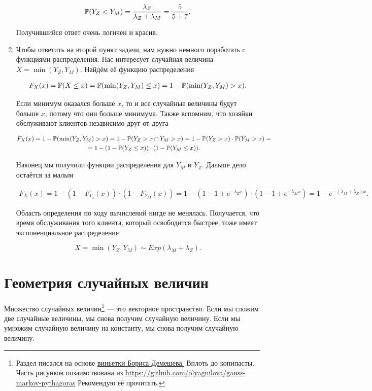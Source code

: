 \documentclass[12pt, a4paper, oneside]{article}
\begin{document}
\begin{sol}
\begin{enumerate}
\[
\mathbb{P}(Y_Z < Y_M) = \frac{\lambda_Z}{\lambda_Z + \lambda_M} = \frac{5}{5 + 7}.  
\]

Получившийся ответ очень логичен и красив. 

\item Чтобы ответить на второй пункт задачи, нам нужно немного поработать c функциями распределения. Нас интересует случайная величина $X = \min(Y_Z, Y_M)$. Найдём её функцию распределения 

\begin{multline*} 
F_X(x) = \mathbb{P}(X \le x) = \mathbb{P}(\min(Y_Z, Y_M) \le x) = 1 - \mathbb{P}(\min(Y_Z, Y_M) > x).
\end{multline*}

Если минимум оказался больше $x$, то и все случайные величины будут больше $x$, потому что они больше минимума. Также вспомним, что хозяйки обслуживают клиентов независимо друг от друга

\begin{multline*} 
F_X(x) = 1 - \mathbb{P}(\min(Y_Z, Y_M) > x) = 1 - \mathbb{P}(Y_Z > x \cap Y_M > x) = 1 - \mathbb{P}(Y_Z > x) \cdot \mathbb{P}(Y_M > x) = \\ = 1 - (1 - \mathbb{P}(Y_Z \le x)) \cdot (1 - \mathbb{P}(Y_M \le x)).
\end{multline*}

Наконец мы получили функции распределения для $Y_M$ и $Y_Z$. Дальше дело остаётся за малым

\begin{multline*} 
F_X(x) = 1 - (1 - F_{Y_z}(x)) \cdot (1 - F_{Y_M}(x)) = 1 - (1 - 1 + e^{-\lambda_Z x}) \cdot (1 - 1 + e^{-\lambda_M x}) = 1 - e^{-(\lambda_M + \lambda_Z) x}.
\end{multline*}

Область определения по ходу вычислений нигде не менялась. Получается, что время обслуживания того клиента, который освободится быстрее, тоже имеет экспоненциальное распределение 

\[
X = \min(Y_Z, Y_M) \sim Exp(\lambda_M + \lambda_Z).
\]
\end{enumerate}
\end{sol}

\section{Геометрия случайных величин}

Множество случайных величин\footnote{Раздел писался на основе \href{https://github.com/bdemeshev/pr201/tree/master/geom\_random}{виньетки Бориса Демешева.} Вплоть до копипасты. Часть рисунков позаимствована из \href{виньетки про геометрию распределений. }{https://github.com/olyagnilova/gauss-markov-pythagoras} Рекомендую её прочитать.} --- это векторное пространство. Если мы сложим две случайные величины, мы снова получим случайную величину. Если мы умножим случайную величину на константу, мы снова получим случайную величину.
\end{document}
